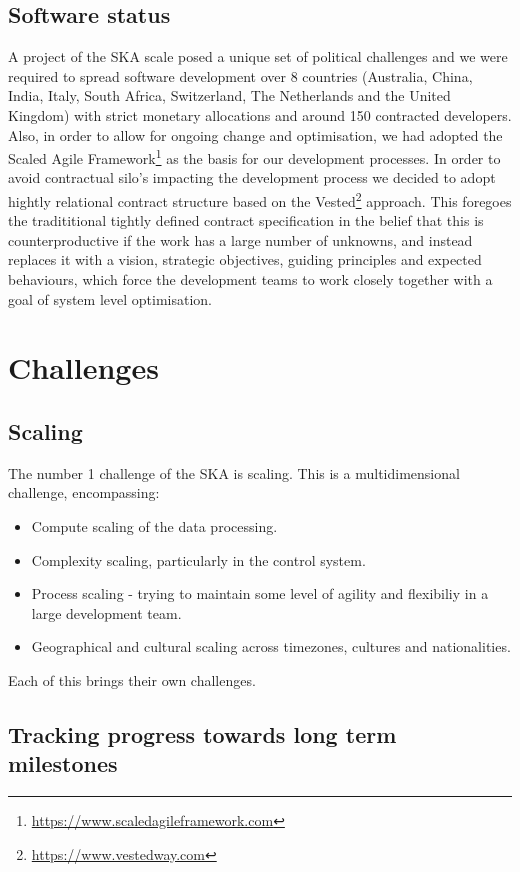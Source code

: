 \documentclass[a4paper,
               biblatex,     %
               keeplastbox,   %
               ]{jacow}
\begin{document}
\subsection{Software status}
A project of the SKA scale posed a unique set of political challenges and we were required to spread software development over 8 countries (Australia, China, India, Italy, South Africa, Switzerland, The Netherlands and the United Kingdom) with strict monetary allocations and around 150 contracted developers. Also, in order to allow for ongoing change and optimisation, we had adopted the Scaled Agile Framework\footnote{\url{https://www.scaledagileframework.com}} as the basis for our development processes. In order to avoid contractual silo's impacting the development process we decided to adopt hightly relational contract structure based on the Vested\footnote{\url{https://www.vestedway.com}} approach. This foregoes the tradititional tightly defined contract specification in the belief that this is counterproductive if the work has a large number of unknowns, and instead replaces it with a vision, strategic objectives, guiding principles and expected behaviours, which force the development teams to work closely together with a goal of system level optimisation.

\section{Challenges}
\subsection{Scaling}
The number 1 challenge of the SKA is scaling. This is a multidimensional challenge, encompassing:
\begin{itemize}
	\item Compute scaling of the data processing.
	\item Complexity scaling, particularly in the control system.
	\item Process scaling - trying to maintain some level of agility and flexibiliy in a large development team.
	\item Geographical and cultural scaling across timezones, cultures and nationalities.
\end{itemize}
Each of this brings their own challenges.

\subsection{Tracking progress towards long term milestones}
\end{document}

